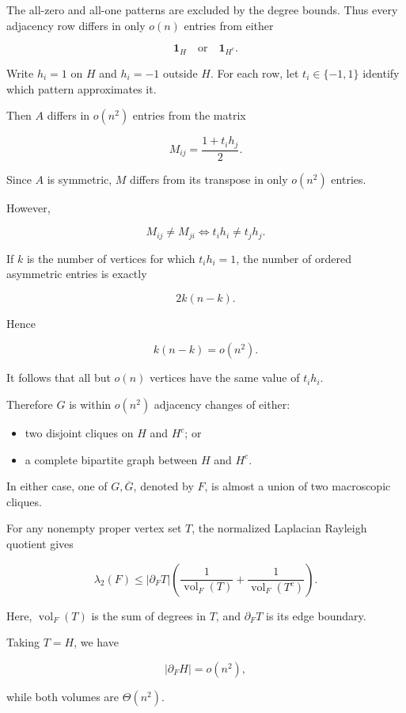 \documentclass[11pt]{article}
\begin{document}
The all-zero and all-one patterns are excluded by the degree bounds. Thus every adjacency row differs in only \(o(n)\) entries from either

\[
\mathbf1_H
\quad\text{or}\quad
\mathbf1_{H^c}.
\]

Write \(h_i=1\) on \(H\) and \(h_i=-1\) outside \(H\). For each row, let \(t_i\in\{-1,1\}\) identify which pattern approximates it.

Then \(A\) differs in \(o(n^2)\) entries from the matrix

\[
M_{ij}=\frac{1+t_i h_j}{2}.
\]

Since \(A\) is symmetric, \(M\) differs from its transpose in only \(o(n^2)\) entries.

However,

\[
M_{ij}\ne M_{ji}
\iff
t_i h_i\ne t_j h_j.
\]

If \(k\) is the number of vertices for which \(t_i h_i=1\), the number of ordered asymmetric entries is exactly

\[
2k(n-k).
\]

Hence

\[
k(n-k)=o(n^2).
\]

It follows that all but \(o(n)\) vertices have the same value of \(t_i h_i\).

Therefore \(G\) is within \(o(n^2)\) adjacency changes of either:

\begin{itemize}
\item two disjoint cliques on \(H\) and \(H^c\); or
\item a complete bipartite graph between \(H\) and \(H^c\).

\end{itemize}

In either case, one of \(G,\overline G\), denoted by \(F\), is almost a union of two macroscopic cliques.

For any nonempty proper vertex set \(T\), the normalized Laplacian Rayleigh quotient gives

\[
\lambda_2(F)\leq
|\partial_F T|
\left(
\frac1{\operatorname{vol}_F(T)}
+
\frac1{\operatorname{vol}_F(T^c)}
\right).
\tag{7}
\]

Here, \(\operatorname{vol}_F(T)\) is the sum of degrees in \(T\), and \(\partial_F T\) is its edge boundary.

Taking \(T=H\), we have

\[
|\partial_F H|=o(n^2),
\]

while both volumes are \(\Theta(n^2)\).
\end{document}
